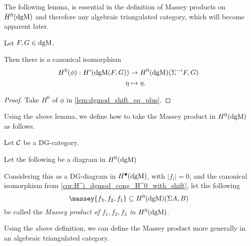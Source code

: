 The following lemma, is essential in the definition of Massey products on \( H^0(\operatorname{dgM}) \) and therefore any algebraic triangulated category, which will become apparent later.

\begin{lemma}
    \label{cor:H^i_dgmod_cong_H^0_with_shift}
    Let \( F, G \in \operatorname{dgM} \).

    Then there is a canonical isomorphism
    \begin{align*}
        H^0(\phi): H^i(\operatorname{dgM}(F, G)) &\to H^0(\operatorname{dgM})(\Sigma^{-i} F, G) \\
        \eta &\mapsto \eta.
    \end{align*}
\end{lemma}
\begin{proof}
    Take \( H^0 \) of \( \phi \) in \autoref{lem:dgmod_shift_eq_plus}.
\end{proof}

Using the above lemma, we define how to take the Massey product in \( H^0(\operatorname{dgM}) \) as follows.

\begin{definition}
    \label{def:massey_product_H^0(dgMod_dg(C))}
    Let \( {\mathcal{C}} \) be a DG-category.
    
    Let the following be a diagram in \( H^0(\operatorname{dgM}) \)
    \begin{center}
    \end{center}
    Considering this as a DG-diagram in \( H^{\bullet}(\operatorname{dgM}) \), with \( |f_i| = 0 \), and the canonical isomorphism from \autoref{cor:H^i_dgmod_cong_H^0_with_shift}, let the following
    \[
        \massey{f_3, f_2, f_1} \subseteq H^0(\dgM)(\Sigma A, B)
    \]
    be called the \emph{Massey product of \( f_1, f_2, f_3 \) in \( H^0(\operatorname{dgM}) \)}.
\end{definition}

Using the above definition, we can define the Massey product more generally in an algebraic triangulated category.

